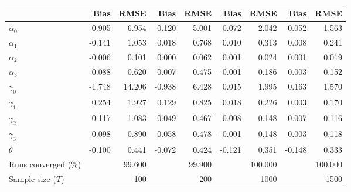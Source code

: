 
\begin{tabular}[t]{lrrrrrrrr}
\toprule
  & Bias & RMSE & Bias & RMSE & Bias & RMSE & Bias & RMSE\\
\midrule
$\alpha_{0}$ & -0.905 & 6.954 & 0.120 & 5.001 & 0.072 & 2.042 & 0.052 & 1.563\\
$\alpha_{1}$ & -0.141 & 1.053 & 0.018 & 0.768 & 0.010 & 0.313 & 0.008 & 0.241\\
$\alpha_{2}$ & -0.006 & 0.101 & 0.000 & 0.062 & 0.001 & 0.024 & 0.001 & 0.019\\
$\alpha_{3}$ & -0.088 & 0.620 & 0.007 & 0.475 & -0.001 & 0.186 & 0.003 & 0.152\\
$\gamma_{0}$ & -1.748 & 14.206 & -0.938 & 6.428 & 0.015 & 1.995 & 0.163 & 1.570\\
$\gamma_{1}$ & 0.254 & 1.927 & 0.129 & 0.825 & 0.018 & 0.226 & 0.003 & 0.170\\
$\gamma_{2}$ & 0.117 & 1.083 & 0.049 & 0.467 & 0.008 & 0.148 & 0.007 & 0.116\\
$\gamma_{3}$ & 0.098 & 0.890 & 0.058 & 0.478 & -0.001 & 0.148 & 0.003 & 0.118\\
$\theta$ & -0.100 & 0.441 & -0.072 & 0.424 & -0.121 & 0.351 & -0.148 & 0.333\\
Runs converged (\%) &  & 99.600 &  & 99.900 &  & 100.000 &  & 100.000\\
Sample size ($T$) &  & 100 &  & 200 &  & 1000 &  & 1500\\
\bottomrule
\end{tabular}
